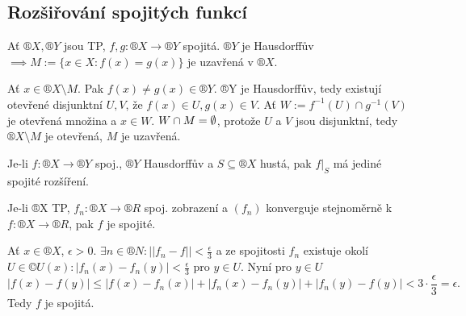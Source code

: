 \documentclass[12pt]{article}					%
\begin{document}
    \subsection{Rozšiřování spojitých funkcí}
        \begin{tvrzeni}
            Ať $®X, ®Y$ jsou TP, $f, g: ®X \rightarrow ®Y$ spojitá. $®Y$ je Hausdorffův $\implies M:=\{x\in X: f(x) = g(x)\}$ je uzavřená v $®X$.

            \begin{dukazin}
                Ať $x \in ®X\setminus M$. Pak $f(x)≠g(x) \in ®Y$. ®Y je Hausdorffův, tedy existují otevřené disjunktní $U, V$, že $f(x) \in U, g(x) \in V$. Ať $W := f^{-1}(U) \cap g^{-1}(V)$ je otevřená množina a $x \in W$. $W \cap M = \emptyset$, protože $U$ a $V$ jsou disjunktní, tedy $®X \setminus M$ je otevřená, $M$ je uzavřená.
            \end{dukazin}
        \end{tvrzeni}

        \begin{poznamka}
            Je-li $f: ®X \rightarrow ®Y$ spoj., $®Y$ Hausdorffův a $S \subseteq ®X$ hustá, pak $f|_S$ má  jediné spojité rozšíření.
        \end{poznamka}

        \begin{tvrzeni}
            Je-li ®X TP, $f_n: ®X \rightarrow ®R$ spoj. zobrazení a $(f_n)$ konverguje stejnoměrně k $f: ®X \rightarrow ®R$, pak $f$ je spojité.

            \begin{dukazin}
                Ať $x \in ®X$, $\epsilon > 0$. $\exists n \in ®N: ||f_n - f|| < \frac{\epsilon}{3}$ a ze spojitosti $f_n$ existuje okolí $U \in ©U(x): \left|f_n(x) - f_n(y)\right| < \frac{\epsilon}{3}$ pro $y \in U$. Nyní pro $y \in U$
                $$ |f(x) - f(y)| ≤ \left|f(x) - f_n(x)\right| + \left|f_n(x) - f_n(y)\right| + \left|f_n(y) - f(y)\right| < 3·\frac{\epsilon}{3} = \epsilon. $$ 
                Tedy $f$ je spojitá.
            \end{dukazin}
        \end{tvrzeni}
\end{document}
